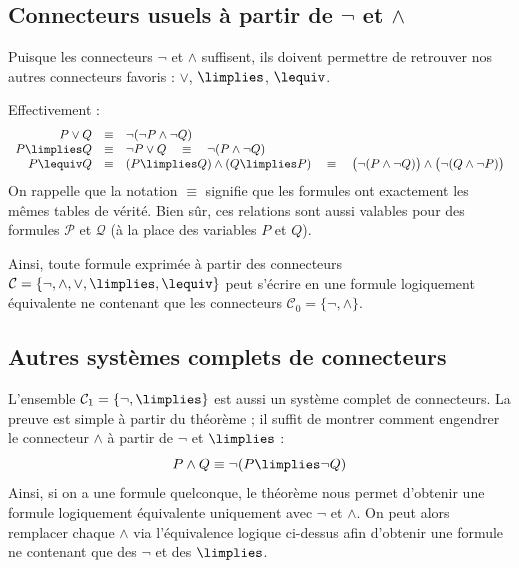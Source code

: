 \documentclass[11pt,class=report,crop=false]{standalone}
\begin{document}
\subsection{Connecteurs usuels à partir de $\lnot$ et $\land$}

Puisque les connecteurs $\lnot$ et $\land$ suffisent, ils doivent permettre de retrouver nos autres connecteurs favoris : $\lor$, $\limplies$, $\lequiv$.

Effectivement :
\[
\begin{array}{rcl}
	P \lor Q &\equiv& \lnot(\lnot P \land \lnot Q) \\
	P \limplies Q &\equiv& \lnot P \lor Q \quad \equiv \quad \lnot (P \land \lnot Q) \\
	P \lequiv Q &\equiv& (P \limplies Q) \land (Q \limplies P) \quad \equiv \quad
	\big(\lnot (P \land \lnot Q)\big) \land \big(\lnot (Q \land \lnot P)\big)
\end{array}
\]
On rappelle que la notation $\equiv$ signifie que les formules ont exactement les mêmes tables de vérité.
Bien sûr, ces relations sont aussi valables pour des formules $\mathcal{P}$ et $\mathcal{Q}$ (à la place des variables $P$ et $Q$).

Ainsi, toute formule exprimée à partir des connecteurs $\mathcal{C} = \{\lnot, \land, \lor, \limplies, \lequiv\}$ peut s'écrire en une formule logiquement équivalente ne contenant que les connecteurs $\mathcal{C}_0 = \{\lnot, \land\}$.



\subsection{Autres systèmes complets de connecteurs}

L'ensemble $\mathcal{C}_1 = \{ \lnot, \limplies \}$ est aussi un système complet de connecteurs. La preuve est simple à partir du théorème ; il suffit de montrer comment engendrer le connecteur $\land$ à partir de $\lnot$ et $\limplies$ :
\[
P \land Q \equiv \lnot (P \limplies \lnot Q)
\]
Ainsi, si on a une formule quelconque, le théorème nous permet d'obtenir une formule logiquement équivalente uniquement avec $\lnot$ et $\land$. On peut alors remplacer chaque $\land$ via l'équivalence logique ci-dessus afin d'obtenir une formule ne contenant que des $\lnot$ et des $\limplies$.

\bigskip
\end{document}
